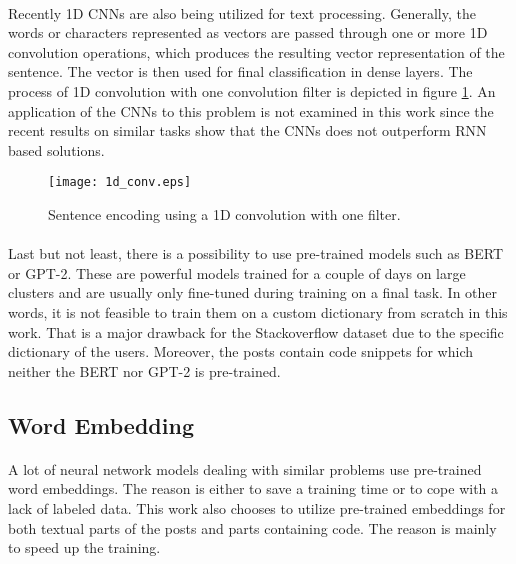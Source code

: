 \paragraph{}
Recently 1D CNNs are also being utilized for text processing. Generally, the words or characters represented as vectors are passed through one or more 1D convolution operations, which produces the resulting vector representation of the sentence. The vector is then used for final classification in dense layers. The process of 1D convolution with one convolution filter is depicted in figure \ref{1d_conv}. An application of the CNNs to this problem is not examined in this work since the recent results on similar tasks show that the CNNs does not outperform RNN based solutions.


\begin{figure}[!h]
	\texttt{[image: 1d\_conv.eps]}
	\centering
	\caption{Sentence encoding using a 1D convolution with one filter.}
	\label{1d_conv}
\end{figure} 

\paragraph{}
Last but not least, there is a possibility to use pre-trained models such as BERT or GPT-2. These are powerful models trained for a couple of days on large clusters and are usually only fine-tuned during training on a final task. In other words, it is not feasible to train them on a custom dictionary from scratch in this work. That is a major drawback for the Stackoverflow dataset due to the specific dictionary of the users. Moreover, the posts contain code snippets for which neither the BERT nor GPT-2 is pre-trained.

\subsection{Word Embedding}\label{word_embedding_analysis}
\paragraph{}
A lot of neural network models dealing with similar problems use pre-trained word embeddings. The reason is either to save a training time or to cope with a lack of labeled data. This work also chooses to utilize pre-trained embeddings for both textual parts of the posts and parts containing code. The reason is mainly to speed up the training.

